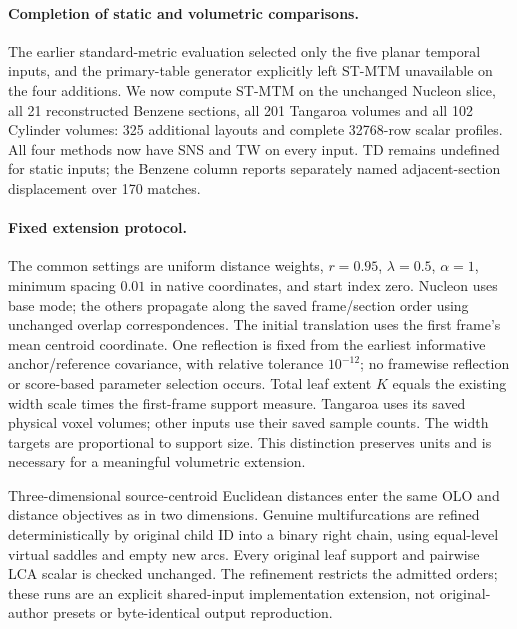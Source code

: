 \paragraph{Completion of static and volumetric comparisons.}
The earlier standard-metric evaluation selected only the five planar temporal inputs, and the primary-table generator explicitly left ST-MTM unavailable on the four additions. We now compute ST-MTM on the unchanged Nucleon slice, all 21 reconstructed Benzene sections, all 201 Tangaroa volumes and all 102 Cylinder volumes: 325 additional layouts and complete 32768-row scalar profiles. All four methods now have SNS and TW on every input. TD remains undefined for static inputs; the Benzene column reports separately named adjacent-section displacement over 170 matches.

\paragraph{Fixed extension protocol.}
The common settings are uniform distance weights, $r=0.95$, $\lambda=0.5$, $\alpha=1$, minimum spacing $0.01$ in native coordinates, and start index zero. Nucleon uses base mode; the others propagate along the saved frame/section order using unchanged overlap correspondences. The initial translation uses the first frame's mean centroid coordinate. One reflection is fixed from the earliest informative anchor/reference covariance, with relative tolerance $10^{-12}$; no framewise reflection or score-based parameter selection occurs. Total leaf extent $K$ equals the existing width scale times the first-frame support measure. Tangaroa uses its saved physical voxel volumes; other inputs use their saved sample counts. The width targets are proportional to support size. This distinction preserves units and is necessary for a meaningful volumetric extension.

Three-dimensional source-centroid Euclidean distances enter the same OLO and distance objectives as in two dimensions. Genuine multifurcations are refined deterministically by original child ID into a binary right chain, using equal-level virtual saddles and empty new arcs. Every original leaf support and pairwise LCA scalar is checked unchanged. The refinement restricts the admitted orders; these runs are an explicit shared-input implementation extension, not original-author presets or byte-identical output reproduction.

